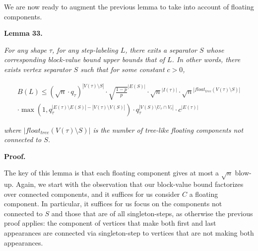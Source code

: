 \documentclass[10pt,a4paper]{article}
\begin{document}
We are now ready to augment the previous lemma to take into account of floating components.\par





\par\medskip\noindent\textbf{
\textbf{Lemma 33}\textbf{.}
}\par



\emph{For any shape $\tau$, for any step-labeling $L$, there exits a separator $S$ whose corresponding block-value bound upper bounds that of $L$. In other words, there exists vertex separator $S$ such that for some constant $c>0$,}\par


\[\begin{gathered}
\displaystyle B(L) \displaystyle\leq(\sqrt{n}\cdot q_{\tau})^{|V(\tau)\setminus S|}\cdot\sqrt{\frac{1-p}{p}}^{|E(S)|}\cdot\sqrt{n}^{|I(\tau)|}\cdot\sqrt{n}^{|float_{tree}(V(\tau)\setminus S)|} \\
\displaystyle\cdot\max(1,q_{\tau}^{|E(\tau)\setminus E(S)|-|V(\tau)\setminus V(S)|})\cdot q_{\tau}^{|V(S)\setminus U_{\tau}\cap V_{\tau}|}\cdot c^{|E(\tau)|}
\end{gathered}\]


\emph{where $|float_{tree}(V(\tau)\setminus S)|$ is the number of tree-like floating components not connected to $S$.}\par







\par\medskip\noindent\textbf{Proof.}\par




The key of this lemma is that each floating component gives at most a $\sqrt{n}$ blow-up.
Again, we start with the observation that our block-value bound factorizes over connected components, and it suffices for us consider $C$ a floating component. In particular, it suffices for us focus on the components not connected to $S$ and those that are of all singleton-steps, as otherwise the previous proof applies: the component of vertices that make both first and last appearances are connected via singleton-step to vertices that are not making both appearances.\par
\end{document}
